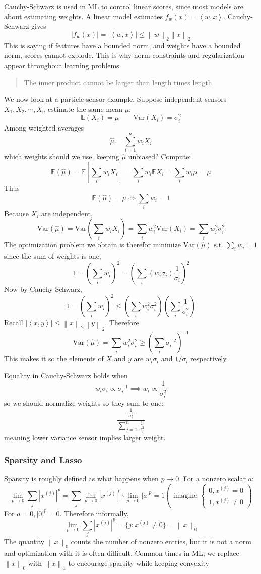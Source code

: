 \documentclass[12pt,oneside]{book}
\numberwithin{equation}{section}
\theoremstyle{definition}
\theoremstyle{plain}
\theoremstyle{remark}
\newcommand{\E}{\mathbb{E}}
\newcommand{\Var}{\mathrm{Var}}
\newcommand{\norm}[1]{\left\lVert #1 \right\rVert}
\newcommand{\abs}[1]{\left\lvert #1 \right\rvert}
\newcommand{\inner}[2]{\left\langle #1, #2 \right\rangle}
\begin{document}
Cauchy-Schwarz is used in ML to control linear scores, since most models are about estimating weights. A linear model estimates $f_w(x) = \inner{w}{x}$. Cauchy-Schwarz gives 
\[|f_w(x)|=|\inner{w}{x}| \le \norm{w}_2 \norm{x}_2\]
This is saying if features have a bounded norm, and weights have a bounded norm, scores cannot explode. This is why norm constraints and regularization appear throughout learning problems. 
\begin{quote}
    The inner product cannot be larger than length times length
\end{quote}
We now look at a particle sensor example. Suppose independent sensors $X_1, X_2, \cdots , X_n$ estimate the same mean $\mu$:
\[\E (X_i) = \mu \qquad \Var (X_i) = \sigma_i^2 \]
Among weighted averages \[\hat{\mu}=\sum_{i=1}^n w_i X_i\] which weights should we use, keeping $\hat{\mu}$ unbiased? Compute:
\[\E (\hat{\mu})=\E [\sum_i w_i X_i] = \sum_i w_i \E X_i = \sum_i w_i \mu = \mu\]
Thus
\[\E (\hat{\mu}) = \mu \iff \sum_i w_i = 1\]
Because $X_i$ are independent,
\[\Var(\hat{\mu})=\Var(\sum_i w_iX_i)=\sum_i w_i^2 \Var(X_i)=\sum_i w_i^2\sigma_i^2\]
The optimization problem we obtain is therefor minimize $\Var(\hat{\mu}) \text{ s.t. } \sum_i w_i = 1$
since the sum of weights is one, \[1 = (\sum_i w_i)^2 = (\sum_i (w_i \sigma_i)\frac{1}{\sigma_i})^2\]
Now by Cauchy-Schwarz, \[1 = (\sum_i w_i)^2 \le (\sum_i w_i^2 \sigma_i^2) (\sum_i \frac{1}{\sigma_i^2})\]
Recall $|\inner{x}{y}| \le \norm{x}_2 \norm{y}_2$. Therefore \[\Var(\hat{\mu})=\sum_i w_i^2 \sigma_i^2 \ge (\sum_i \sigma_i^{-2})^{-1}\]
This makes it so the elements of $X$ and $y$ are $w_i \sigma_i$ and $1/\sigma_i$ respectively. 

Equality in Cauchy-Schwarz holds when \[w_i \sigma_i \propto \sigma_i^{-1} \implies w_i \propto \frac{1}{\sigma_i^2}\] so we should normalize weights so they sum to one: \[\frac{\frac{1}{\sigma_i^2}}{\sum_{j=1}^n \frac{1}{\sigma_i^2}}\] meaning lower variance sensor implies larger weight. 

\subsubsection{Sparsity and Lasso}
Sparsity is roughly defined as what happens when $p \rightarrow 0$. For a nonzero scalar $a$: 
\[\lim_{p \rightarrow 0} \sum_j \abs{x^{(j)}}^p = \sum_j \lim_{p \rightarrow 0}  \abs{x^{(j)}}^p \therefore \lim_{p\rightarrow 0} \abs{a}^p=1 (\text{ imagine } 
\begin{cases}
    0, x^{(j)}=0 \\
    1, x^{(j)}\ne 0
\end{cases}
)\]
For $a=0, \abs{0}^p=0$. Therefore informally, \[\lim_{p\rightarrow 0} \sum_j \abs{x^{(j)}}^p=\{j : x^{(j)} \ne 0\}=\norm{x}_0\]
The quantity $\norm{x}_0$ counts the number of nonzero entries, but it is not a norm and optimization with it is often difficult. Common times in ML, we replace $\norm{x}_0$ with $\norm{x}_1$ to encourage sparsity while keeping convexity
\end{document}
